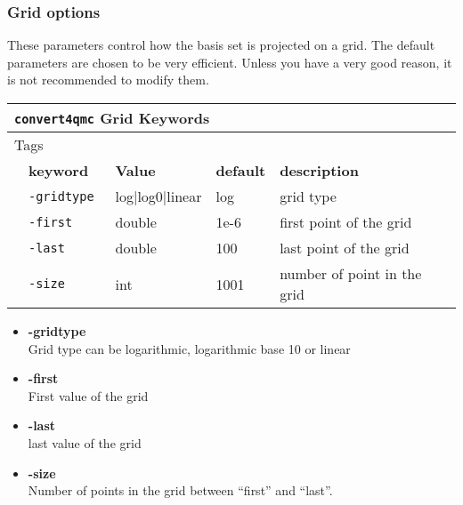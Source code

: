 \subsubsection{Grid options}
                                          
% 
These parameters control how the basis set is projected on a grid. The default parameters are chosen to be very efficient. Unless you have a very good reason, it is not recommended to modify them. 

\begin{table}[h]
 \begin{center}
 \begin{tabularx}{\textwidth}{l l l l l }
 \hline
 \multicolumn{5}{l}{\texttt{convert4qmc} Grid Keywords} \\
 \hline
 \multicolumn{2}{l}{Tags}  & \multicolumn{3}{l}{}\\
    &   \bfseries keyword      & \bfseries Value & \bfseries default   & \bfseries description \\
    &   \texttt{-gridtype    } &  log|log0|linear      &  log & grid type  \\
    &   \texttt{-first         } & double  &  1e-6 & first point of the grid   \\
    &   \texttt{-last       } & double  & 100 & last point of the grid \\
    &   \texttt{-size      } &  int    &  1001& number of point in the grid   \\
     \hline
     \end{tabularx}
 \end{center}
 \end{table}
\begin{itemize}
\item \textbf{-gridtype}\\
Grid type can be logarithmic, logarithmic base 10 or linear \\
\item \textbf{-first}\\
First value of the grid\\
\item \textbf{-last}\\
last value of the grid\\
\item \textbf{-size}\\
Number of points in the grid between ``first'' and ``last''. \\
\end{itemize}


